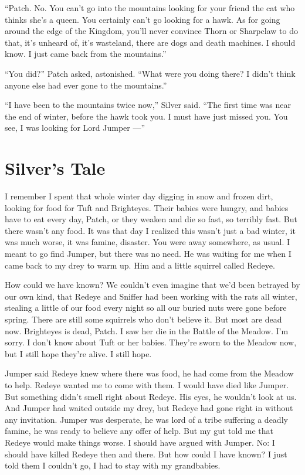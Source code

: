 \documentclass[ebook,oneside,openany,12pt]{memoir}
\begin{document}
“Patch. No. You can’t go into the mountains looking for your friend
the cat who thinks she’s a queen. You certainly can’t go looking for a
hawk. As for going around the edge of the Kingdom, you’ll never
convince Thorn or Sharpclaw to do that, it’s unheard of, it’s
wasteland, there are dogs and death machines. I should know. I just
came back from the mountains.”

“You did?” Patch asked, astonished. “What were you doing there? I
didn’t think anyone else had ever gone to the mountains.”

“I have been to the mountains twice now,” Silver said. “The first time
was near the end of winter, before the hawk took you. I must have just
missed you. You see, I was looking for Lord Jumper —”


\section{Silver’s Tale}

I remember I spent that whole winter day digging in snow and frozen
dirt, looking for food for Tuft and Brighteyes. Their babies were
hungry, and babies have to eat every day, Patch, or they weaken and
die so fast, so terribly fast. But there wasn’t any food. It was that
day I realized this wasn’t just a bad winter, it was much worse, it
was famine, disaster. You were away somewhere, as usual. I meant to go
find Jumper, but there was no need. He was waiting for me when I came
back to my drey to warm up. Him and a little squirrel called Redeye.

How could we have known? We couldn’t even imagine that we’d been
betrayed by our own kind, that Redeye and Sniffer had been working
with the rats all winter, stealing a little of our food every night so
all our buried nuts were gone before spring. There are still some
squirrels who don’t believe it. But most are dead now. Brighteyes is
dead, Patch. I saw her die in the Battle of the Meadow. I’m sorry. I
don’t know about Tuft or her babies. They’re sworn to the Meadow now,
but I still hope they’re alive. I still hope.

Jumper said Redeye knew where there was food, he had come from the
Meadow to help. Redeye wanted me to come with them. I would have died
like Jumper. But something didn’t smell right about Redeye. His eyes,
he wouldn’t look at us. And Jumper had waited outside my drey, but
Redeye had gone right in without any invitation. Jumper was desperate,
he was lord of a tribe suffering a deadly famine, he was ready to
believe any offer of help. But my gut told me that Redeye would make
things worse. I should have argued with Jumper. No: I should have
killed Redeye then and there. But how could I have known? I just told
them I couldn’t go, I had to stay with my grandbabies.
\end{document}
